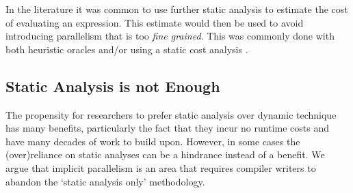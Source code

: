 In the literature it was common to use further static analysis to estimate the
cost of evaluating an expression. This estimate would then be used to avoid
introducing parallelism that is too \emph{fine grained}. This was commonly done
with both heuristic oracles and/or using a static cost analysis
\citep{hogen1992automatic} .

%
%
%

%


\subsection{Static Analysis is not Enough}

The propensity for researchers to prefer static analysis over dynamic technique
has many benefits, particularly the fact that they incur no runtime costs and
have many decades of work to build upon. However, in some cases the
(over)reliance on static analyses can be a hindrance instead of a benefit. We
argue that implicit parallelism is an area that requires compiler writers to
abandon the `static analysis only' methodology.

